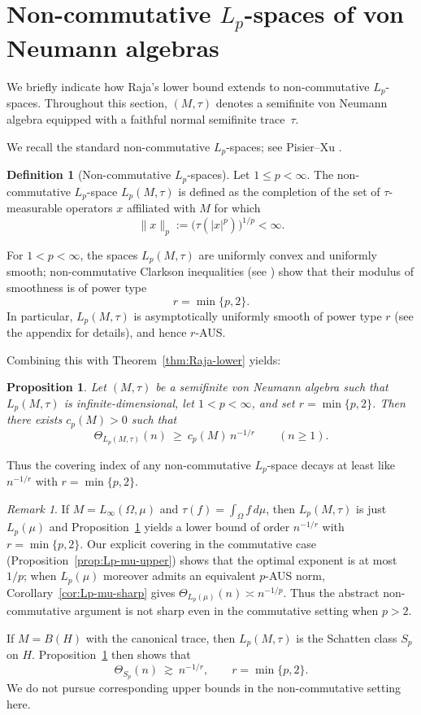 \documentclass[reqno,11pt]{amsart}
\theoremstyle{plain}
\newtheorem{proposition}[theorem]{Proposition}
\theoremstyle{definition}
\newtheorem{definition}[theorem]{Definition}
\theoremstyle{remark}
\newtheorem{remark}[theorem]{Remark}
\renewcommand{\le}{\leqslant}
\renewcommand{\ge}{\geqslant}
\begin{document}
\section{Non-commutative $L_p$-spaces of von Neumann algebras}

We briefly indicate how Raja's lower bound extends to non-commutative $L_p$-spaces.  Throughout this section, $(M,\tau)$ denotes a semifinite von Neumann algebra equipped with a faithful normal semifinite trace~$\tau$.

We recall the standard non-commutative $L_p$-spaces; see Pisier--Xu \cite{PisierXu}.

\begin{definition}[Non-commutative $L_p$-spaces]
Let $1\le p<\infty$.  The non-commutative $L_p$-space $L_p(M,\tau)$ is defined as the completion of the set of $\tau$-measurable operators $x$ affiliated with $M$ for which
\[
\|x\|_p := \bigl(\tau(|x|^p)\bigr)^{1/p}<\infty.
\]
\end{definition}

For $1<p<\infty$, the spaces $L_p(M,\tau)$ are uniformly convex and uniformly smooth; non-commutative Clarkson inequalities (see \cite[Section~34.5]{PisierXu}) show that their modulus of smoothness is of power type
\[
r=\min\{p,2\}.
\]
In particular, $L_p(M,\tau)$ is asymptotically uniformly smooth of power type $r$ (see the appendix for details), and hence $r$-AUS.

Combining this with Theorem~\ref{thm:Raja-lower} yields:

\begin{proposition}\label{prop:non-comm-Lp-lower}
Let $(M,\tau)$ be a semifinite von Neumann algebra such that
$L_p(M,\tau)$ is infinite-dimensional, let $1<p<\infty$, and set
$r=\min\{p,2\}$.
Then there exists $c_{p}(M)>0$ such that
\[
\Theta_{L_p(M,\tau)}(n)\ \ge\ c_{p}(M)\,n^{-1/r}
\qquad(n\ge1).
\]
\end{proposition}

Thus the covering index of any non-commutative $L_p$-space decays at least like $n^{-1/r}$ with $r=\min\{p,2\}$.

\begin{remark}
If $M=L_\infty(\Omega,\mu)$ and $\tau(f)=\int_\Omega f\,d\mu$, then $L_p(M,\tau)$ is just $L_p(\mu)$ and Proposition~\ref{prop:non-comm-Lp-lower} yields a lower bound of order $n^{-1/r}$ with $r=\min\{p,2\}$.  Our explicit covering in the commutative case (Proposition~\ref{prop:Lp-mu-upper}) shows that the optimal exponent is at most $1/p$; when $L_p(\mu)$ moreover admits an equivalent $p$-AUS norm, Corollary~\ref{cor:Lp-mu-sharp} gives $\Theta_{L_p(\mu)}(n)\asymp n^{-1/p}$.  Thus the abstract non-commutative argument is not sharp even in the commutative setting when $p>2$.

If $M=B(H)$ with the canonical trace, then $L_p(M,\tau)$ is the Schatten class $S_p$ on $H$.  Proposition~\ref{prop:non-comm-Lp-lower} then shows that
\[
\Theta_{S_p}(n)\ \gtrsim\ n^{-1/r},
\qquad r=\min\{p,2\}.
\]
We do not pursue corresponding upper bounds in the non-commutative setting here.
\end{remark}
\end{document}
